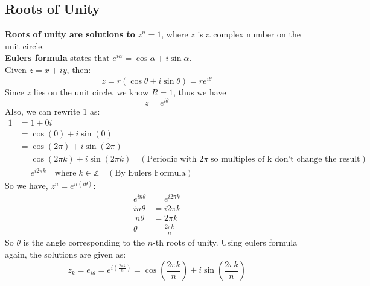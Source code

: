 \documentclass[a4paper,12pt]{article} %
\theoremstyle{definition}
\theoremstyle{plain}
\begin{document}
\subsection{Roots of Unity}
\textbf{Roots of unity are solutions to} $z^n = 1$, where $z$ is a complex number on the unit circle.\\
\textbf{Eulers formula} states that $e^{i\alpha} = \cos\alpha + i\sin\alpha$. \\
Given $z = x+ iy$, then:
$$z = r(\cos\theta + i\sin\theta) = re^{i\theta}$$
Since $z$ lies on the unit circle, we know $R =1$, thus we have
$$z = e^{i\theta}$$
Also, we can rewrite $1$ as:
\begin{align*}
  1 & = 1 + 0i                                                                                                              \\
    & = \cos(0) + i\sin(0)                                                                                                  \\
    & = \cos(2\pi) + i\sin(2\pi)                                                                                            \\
    & = \cos(2\pi k) + i\sin(2\pi k) \quad (\text{Periodic with } 2\pi \; \text{so multiples of k don't change the result}) \\
    & = e^{i2\pi k} \quad \text{where} \; k \in \mathbb{Z} \quad (\text{By Eulers Formula})
\end{align*}
So we have, $z^n = e^{n(i \theta)}$:
\begin{align*}
  e^{in\theta} & = e^{i2\pi k}      \\
  in\theta     & = i 2\pi k         \\\
  n\theta      & = 2\pi k           \\
  \theta       & = \frac{2\pi k}{n}
\end{align*}
So $\theta$ is the angle corresponding to the $n$-th roots of unity. Using eulers formula again, the solutions are given as:
$$z_k = e_{i\theta} = e^{i(\frac{2\pi k}{n})} = \cos\left(\frac{2\pi k}{n}\right) + i \sin\left(\frac{2\pi k}{n}\right)$$

\pagebreak
\end{document}

